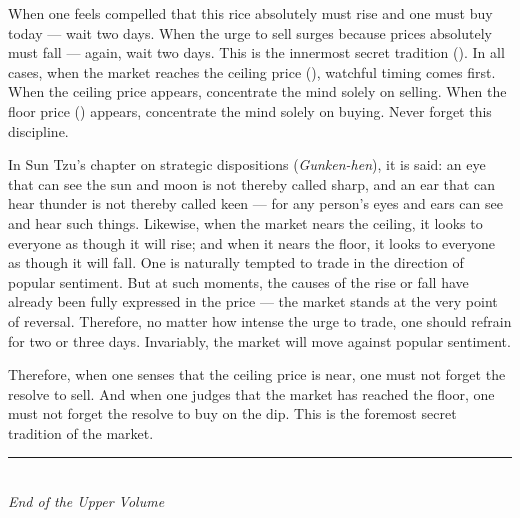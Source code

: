 
\begin{sokyubox}
{\small\itshape\color{sokyubar} }

\medskip
When one feels compelled that this rice absolutely must rise and one must
buy today --- wait two days. When the urge to sell surges because prices
absolutely must fall --- again, wait two days. This is the innermost
secret tradition (). In all cases, when
the market reaches the ceiling price (),
watchful timing comes first. When the ceiling price appears, concentrate
the mind solely on selling. When the floor price () appears, concentrate the mind solely on buying. Never forget this
discipline.
\end{sokyubox}

\commentary
In Sun Tzu's chapter on strategic dispositions (\textit{Gunken-hen}), it
is said: an eye that can see the sun and moon is not thereby called
sharp, and an ear that can hear thunder is not thereby called keen ---
for any person's eyes and ears can see and hear such things. Likewise,
when the market nears the ceiling, it looks to everyone as though it will
rise; and when it nears the floor, it looks to everyone as though it will
fall. One is naturally tempted to trade in the direction of popular
sentiment. But at such moments, the causes of the rise or fall have
already been fully expressed in the price --- the market stands at the
very point of reversal. Therefore, no matter how intense the urge to
trade, one should refrain for two or three days. Invariably, the market
will move against popular sentiment.

Therefore, when one senses that the ceiling price is near, one must not
forget the resolve to sell. And when one judges that the market has
reached the floor, one must not forget the resolve to buy on the dip.
This is the foremost secret tradition of the market.

\begin{center}
\rule{2in}{0.4pt}\\[1em]
{\small\itshape End of the Upper Volume}\\[0.3em]
{\small {}}
\end{center}

